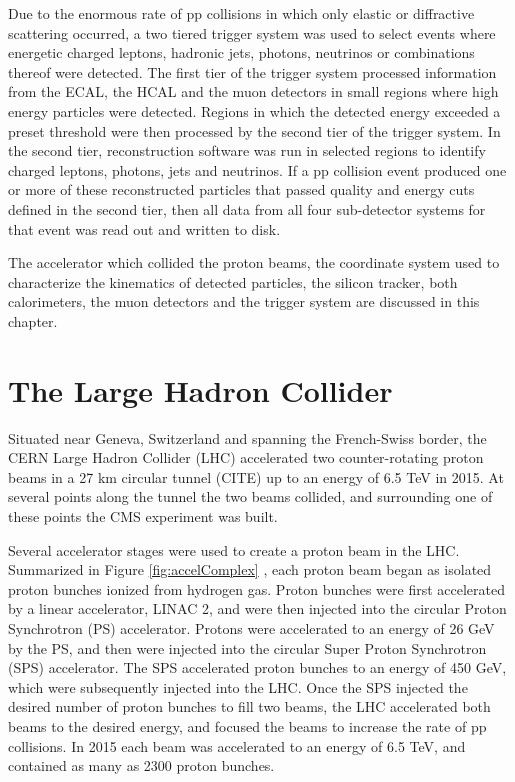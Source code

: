 Due to the enormous rate of pp collisions in which only elastic or diffractive scattering occurred, a two tiered trigger 
system was used to select events where energetic charged leptons, hadronic jets, photons, neutrinos or combinations 
thereof were detected.  The first tier of the trigger system processed information from the ECAL, the HCAL and the muon 
detectors in small regions where high energy particles were detected.  Regions in which the detected energy exceeded 
a preset threshold were then processed by the second tier of the trigger system.  In the second tier, reconstruction software 
was run in selected regions to identify charged leptons, photons, jets and neutrinos.  If a pp collision event produced one 
or more of these reconstructed particles that passed quality and energy cuts defined in the second tier, then all data 
from all four sub-detector systems for that event was read out and written to disk.

The accelerator which collided the proton beams, the coordinate system used to characterize the kinematics of detected 
particles, the silicon tracker, both calorimeters, the muon detectors and the trigger system are discussed in this chapter.

\section{The Large Hadron Collider}
\label{sec:lhcDescription}
Situated near Geneva, Switzerland and spanning the French-Swiss border, the CERN Large Hadron Collider (LHC) accelerated 
two counter-rotating proton beams in a 27 km circular tunnel (CITE) up to an energy of 6.5 TeV in 2015.  At several points along the tunnel 
the two beams collided, and surrounding one of these points the CMS experiment was built.

Several accelerator stages were used to create a proton beam in the LHC.  Summarized in Figure \ref{fig:accelComplex} \cite{DeMelis:2197559}, each 
proton beam began as isolated proton bunches ionized from hydrogen gas.  Proton bunches were first accelerated by a linear 
accelerator, LINAC 2, and were then injected into the circular Proton Synchrotron (PS) accelerator.  Protons were accelerated 
to an energy of 26 GeV by the PS, and then were injected into the circular Super Proton Synchrotron (SPS) accelerator.  
The SPS accelerated proton bunches to an energy of 450 GeV, which were subsequently injected into the LHC.  Once the SPS 
injected the desired number of proton bunches to fill two beams, the LHC accelerated both beams to the desired energy, 
and focused the beams to increase the rate of pp collisions.  In 2015 each beam was accelerated to an energy of 6.5 TeV, and 
contained as many as 2300 proton bunches.

